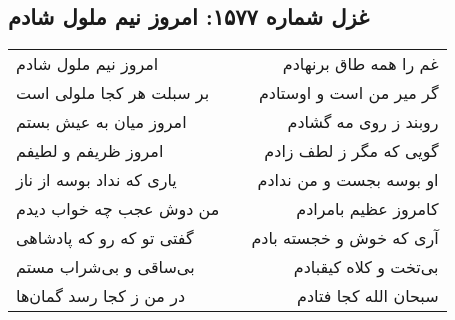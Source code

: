 \begin{center}
\section*{غزل شماره ۱۵۷۷: امروز نیم ملول شادم}
\label{sec:1577}
\begin{longtable}{l p{0.5cm} r}
امروز نیم ملول شادم
&&
غم را همه طاق برنهادم
\\
بر سبلت هر کجا ملولی است
&&
گر میر من است و اوستادم
\\
امروز میان به عیش بستم
&&
روبند ز روی مه گشادم
\\
امروز ظریفم و لطیفم
&&
گویی که مگر ز لطف زادم
\\
یاری که نداد بوسه از ناز
&&
او بوسه بجست و من ندادم
\\
من دوش عجب چه خواب دیدم
&&
کامروز عظیم بامرادم
\\
گفتی تو که رو که پادشاهی
&&
آری که خوش و خجسته بادم
\\
بی‌ساقی و بی‌شراب مستم
&&
بی‌تخت و کلاه کیقبادم
\\
در من ز کجا رسد گمان‌ها
&&
سبحان الله کجا فتادم
\\
\end{longtable}
\end{center}
